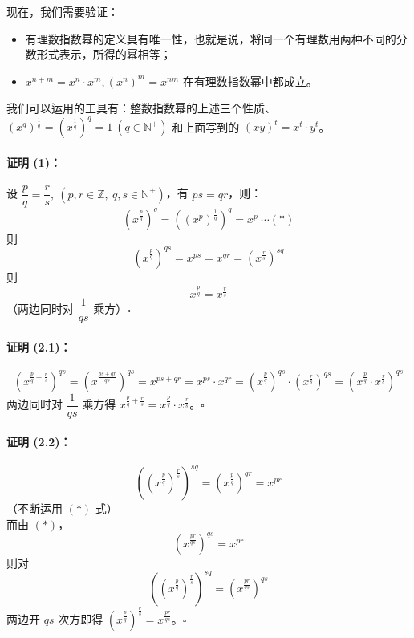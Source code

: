 \documentclass[UTF8,12pt]{ctexart}
\begin{document}
            现在，我们需要验证：
            \begin{itemize}
            \item 有理数指数幂的定义具有唯一性，也就是说，将同一个有理数用两种不同的分数形式表示，所得的幂相等；
            \item $x^{n + m} = x^n\cdot x^m, (x^n)^m = x^{nm}$ 在有理数指数幂中都成立。
            \end{itemize}

            我们可以运用的工具有：整数指数幂的上述三个性质、$(x^q)^{\frac 1 q} = (x^{\frac 1 q})^q = 1\ (q \in \mathbb N^+)$
            和上面写到的 $(xy)^t = x^t\cdot y^t$。

            \paragraph{证明 (1)：} 设 $\dfrac p q = \dfrac r s,\ (p, r\in \mathbb Z,\ q, s\in \mathbb N^+)$，有 $ps = qr$，则：
            $$
            (x^{\frac p q})^q = ((x^p)^{\frac 1 q})^{q} = x^p\ \cdots (*)
            $$
            则
            $$
            (x^{\frac p q})^{qs} = x^{ps} = x^{qr} = (x^{\frac r s})^{sq}
            $$
            则 $$
            x^{\frac p q} = x^{\frac r s}
            $$
            （两边同时对 $\dfrac 1 {qs}$ 乘方）$\square$\\

            \paragraph{证明 (2.1)：}
            $$
            (x^{\frac p q  + \frac r s})^{qs} = (x^{\frac{ps + qr}{qs}})^{qs} = x^{ps + qr} = x^{ps}\cdot x^{qr} = (x^{\frac p q})^{qs} \cdot (x^{\frac r s})^{qs} = (x^{\frac p q}\cdot x^{\frac r s})^{qs}
            $$
            两边同时对 $\dfrac 1 {qs}$ 乘方得 $x^{\frac p q  + \frac r s} = x^{\frac p q}\cdot x^{\frac r s}$。$\square$\\
            
            \paragraph{证明 (2.2)：}
            $$
            ((x^{\frac p q})^{\frac r s})^{sq} = (x^{\frac p q})^{qr} = x^{pr}
            $$
            （不断运用 $(*)$ 式）\\
            而由 $(*)$， $$
            (x^{\frac{pr}{qs}})^{qs} = x^{pr}
            $$
            则对 $$
            ((x^{\frac p q})^{\frac r s})^{sq} = (x^{\frac{pr}{qs}})^{qs}
            $$
            两边开 $qs$ 次方即得 $(x^{\frac p q})^{\frac r s} = x^{\frac{pr}{qs}}$。$\square$
\end{document}
